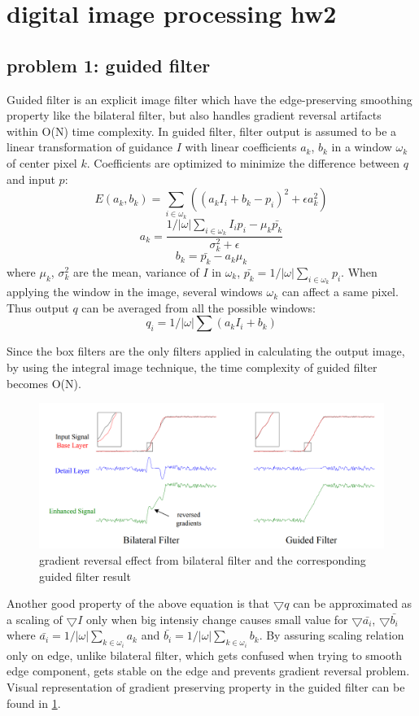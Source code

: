\documentclass[extendedabs]{bmvc2k}
\begin{document}
\section*{digital image processing hw2}
\subsection*{problem 1: guided filter}

Guided filter \cite{guided} is an explicit image filter which have the edge-preserving 
smoothing property like the bilateral filter, but also handles gradient reversal artifacts
within O(N) time complexity. 
In guided filter, filter output is assumed to be a linear transformation of guidance $I$
with linear coefficients $a_k$, $b_k$ in a window $\omega_k$ of center pixel $k$.
Coefficients are optimized to minimize the difference between $q$ and input $p$:
\[E(a_k,b_k) = \sum_{i \in \omega_k}((a_kI_i + b_k - p_i)^2 + \epsilon a_k^2)\]
\[a_k=\frac{1/|\omega|\sum_{i \in \omega_k}I_ip_i - \mu_k\bar{p_k}}{\sigma_k^2+\epsilon}\]
\[b_k=\bar{p_k} - a_k\mu_k\]
where $\mu_k$, $\sigma_k^2$ are the mean, variance of $I$ in $\omega_k$, 
$\bar{p_k}=1/|\omega|\sum_{i \in \omega_k}p_i$. 
When applying the window in the image, several windows $\omega_k$ can affect a same pixel.
Thus output $q$ can be averaged from all the possible windows:
\[q_i = 1/|\omega|\sum(a_kI_i + b_k)\]

Since the box filters are the only filters applied in calculating the output image,
by using the integral image technique, the time complexity of guided filter becomes O(N).

\begin{figure}[h]
    \centering
    \includegraphics[width=\linewidth]{hw2_1_1}
    \caption{gradient reversal effect from bilateral filter and the corresponding guided filter result}
    \label{fig:1}
\end{figure}

Another good property of the above equation is that $\bigtriangledown q$ can be approximated
as a scaling of $\bigtriangledown I$ only when big intensiy change causes small value for
$\bigtriangledown \bar{a_i}$, $\bigtriangledown \bar{b_i}$ where
$\bar{a_i} = 1/|\omega|\sum_{k \in \omega_i}a_k$ and 
$\bar{b_i} = 1/|\omega|\sum_{k \in \omega_i}b_k$. By assuring scaling relation only on edge,
unlike bilateral filter, which gets confused when trying to smooth edge component, gets stable on
the edge and prevents gradient reversal problem.  
Visual representation of gradient preserving property in the guided filter can 
be found in \figurename{\ref{fig:1}}.
\end{document}

